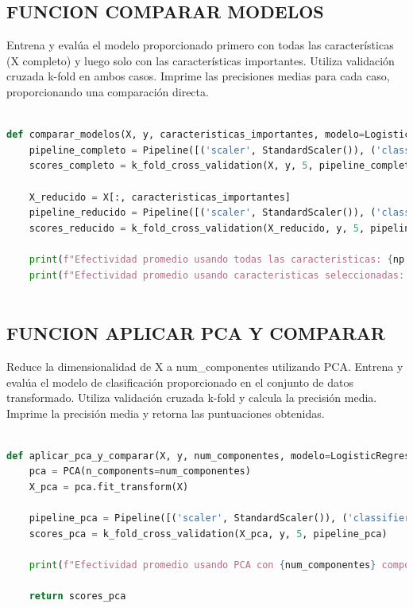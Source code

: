 \documentclass[12pt]{article}
\begin{document}
\subsection*{FUNCION COMPARAR MODELOS}

Entrena y evalúa el modelo proporcionado primero con todas las características (X completo) y luego solo con las características importantes. Utiliza validación cruzada k-fold en ambos casos. Imprime las precisiones medias para cada caso, proporcionando una comparación directa. \vspace{1cm}

\begin{lstlisting}[language=Python]
	
def comparar_modelos(X, y, caracteristicas_importantes, modelo=LogisticRegression()):
	pipeline_completo = Pipeline([('scaler', StandardScaler()), ('classifier', modelo)])
	scores_completo = k_fold_cross_validation(X, y, 5, pipeline_completo)
	
	X_reducido = X[:, caracteristicas_importantes]
	pipeline_reducido = Pipeline([('scaler', StandardScaler()), ('classifier', modelo)])
	scores_reducido = k_fold_cross_validation(X_reducido, y, 5, pipeline_reducido)
	
	print(f"Efectividad promedio usando todas las caracteristicas: {np.mean(scores_completo):.2f}")
	print(f"Efectividad promedio usando caracteristicas seleccionadas: {np.mean(scores_reducido):.2f}")
	
\end{lstlisting}

\subsection*{FUNCION APLICAR PCA Y COMPARAR}

Reduce la dimensionalidad de X a num\_componentes utilizando PCA. Entrena y evalúa el modelo de clasificación proporcionado en el conjunto de datos transformado. Utiliza validación cruzada k-fold y calcula la precisión media. Imprime la precisión media y retorna las puntuaciones obtenidas. \vspace{1cm}

\begin{lstlisting}[language=Python]
	
def aplicar_pca_y_comparar(X, y, num_componentes, modelo=LogisticRegression()):
	pca = PCA(n_components=num_componentes)
	X_pca = pca.fit_transform(X)
	
	pipeline_pca = Pipeline([('scaler', StandardScaler()), ('classifier', modelo)])
	scores_pca = k_fold_cross_validation(X_pca, y, 5, pipeline_pca)
	
	print(f"Efectividad promedio usando PCA con {num_componentes} componentes: {np.mean(scores_pca):.2f}")
	
	return scores_pca
	
\end{lstlisting}
\end{document}
